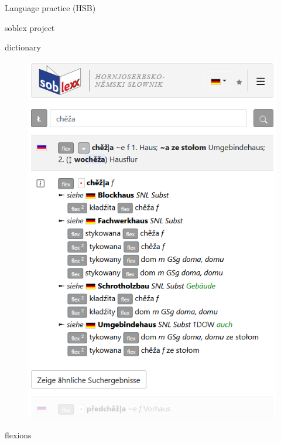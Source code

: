   \begin{block}{Language practice (HSB)}

    
    soblex project\cite{soblex}

    dictionary

    \begin{figure}
        \centering
        \includegraphics[width=0.7\colwidth]{05_z_01_soblex_suche.png}
        \label{fig:soblexsearch}
    \end{figure}

    flexions


\end{block}
